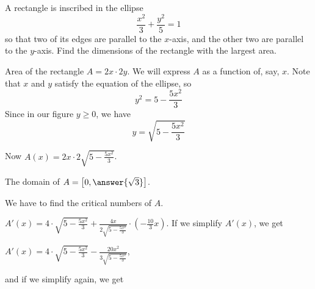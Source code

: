\documentclass{ximera}
\author{Bart Snapp\and Nela Lakos}
\begin{document}
\begin{exercise}

  A rectangle is inscribed in the ellipse
  \[
  \frac{x^2}{3}+\frac{y^2}{5}=1
  \]
  so that two of its edges are parallel to the $x$-axis, and the other two are parallel to the $y$-axis.
  Find the dimensions of the rectangle with the largest area.
  \begin{hint}
  \begin{image}
\end{image}
\end{hint}
\begin{hint}
Area of the rectangle
 $A=2x\cdot 2y$. 
 We will express $A$ as a function of, say, $x$.
Note that $x$ and $y$ satisfy the equation of the ellipse, so
 \[
y^2=5-  \frac{5x^2}{3}
  \]
Since in our figure $y\ge0$, we have 
 \[
y=\sqrt{5-  \frac{5x^2}{3}}
  \]
\end{hint}
\begin{hint}
Now
$A(x)=2x\cdot 2\sqrt{5-  \frac{5x^2}{3}}$.

The domain of $A=\left[0,\answer{\sqrt{3}}\right]$.
\end{hint}
\begin{hint}
We have to find the critical numbers of $A$.


$A'(x)=4\cdot \sqrt{5-  \frac{5x^2}{3}}+\frac{4x}{2\sqrt{5-  \frac{5x^2}{3}}}\cdot \left(-\frac{10}{3}x\right)$.
If we simplify $A'(x)$, we get

$A'(x)=4\cdot \sqrt{5-  \frac{5x^2}{3}}-\frac{20x^2}{3\sqrt{5-  \frac{5x^2}{3}}}$, 

and if we simplify again, we get


\end{hint}
\end{exercise}
\end{document}
